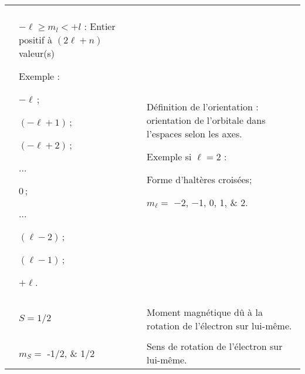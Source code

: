 \begin{xltabular}{\textwidth}{X p{5.5cm} p{7.5cm}}
\addlinespace %
 \\ 
\middashrule %
&
\begin{tabdescription}
	\item[$-\ell\ge m_l<+l$ :] Entier positif à $(2\ell+n)$ valeur(s)
 	\item[Exemple :]\hfill
 		\begin{compactitemize}
			\item $-\ell$\,;
 			\item $(-\ell+1)$\,;
			\item $(-\ell+2)$\,;
 			\item ...
 			\item $0$\,;
 			\item ...
 			\item $(\ell-2)$\,;
 			\item $(\ell-1)$\,;
 			\item $+\ell$.
		\end{compactitemize}
\end{tabdescription} 
& 
\begin{tabdescription}
	\item[Définition de l'orientation :] orientation de l'orbitale dans l'espaces selon les axes.  
	\item[Exemple si $\ell=2$ :]\hfill
		\begin{compactitemize}
 			\item Forme d'haltères croisées;
 			\item $m_\ell=$ \numlist[list-separator = {; }, list-final-separator = {; }]{-2; -1;0;1;2}. %
		\end{compactitemize}
\end{tabdescription} \\ 

\addlinespace %
 \\ 
\middashrule %

& 
$S=1/2$
& 
Moment magnétique dû à la rotation de l'électron sur lui-même.\\ 

\addlinespace %
 \\ 
\middashrule %
& 
$m_S=$ \numlist[list-pair-separator = {; }]{-1/2;1/2}
& 
Sens de rotation de l'électron sur lui-même.\\ 

\bottomrule %
\end{xltabular}

%